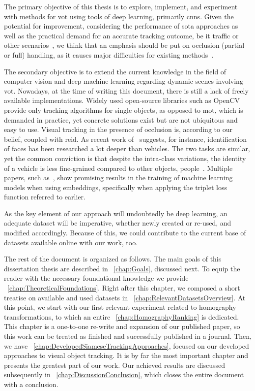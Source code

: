 The primary objective of this thesis is to explore, implement, and experiment with methods for \gls{vot} using tools of deep learning, primarily \glspl{cnn}. Given the potential for improvement, considering the performance of \gls{sota} approaches as well as the practical demand for an accurate tracking outcome, be it traffic or other scenarios~\cite{tang2019cityflow}, we think that an emphasis should be put on occlusion (partial or full) handling, as it causes major difficulties for existing methods~\cite{jiyan2007robustocclusion}.

The secondary objective is to extend the current knowledge in the field of computer vision and deep machine learning regarding dynamic scenes involving \gls{vot}. Nowadays, at the time of writing this document, there is still a lack of freely available implementations. Widely used open-source libraries such as OpenCV~\cite{bradski2000opencv} provide only tracking algorithms for single objects, as opposed to \gls{mot}, which is demanded in practice, yet concrete solutions exist but are not ubiquitous and easy to use. Visual tracking in the presence of occlusion is, according to our belief, coupled with \gls{reid}. As recent work of~\cite{kuma2019vehiclereid} suggests, for instance, identification of faces has been researched a lot deeper than vehicles. The two tasks are similar, yet the common conviction is that despite the intra-class variations, the identity of a vehicle is less fine-grained compared to other objects, \egtext{} people~\cite{kuma2019vehiclereid}. Multiple papers, such as~\cite{schroff2015facenet, hermans2017triplet}, show promising results in the training of machine learning models when using embeddings, specifically when applying the triplet loss function referred to earlier.

As the key element of our approach will undoubtedly be deep learning, an adequate dataset will be imperative, whether newly created or re-used, and modified accordingly. Because of this, we could contribute to the current base of datasets available online with our work, too.

The rest of the document is organized as follows. The main goals of this dissertation thesis are described in \chaptertext{}~\ref{chap:Goals}, discussed next. To equip the reader with the necessary foundational knowledge we provide \chaptertext{}~\ref{chap:TheoreticalFoundations}. Right after this chapter, we composed a short treatise on available and used datasets in \chaptertext{}~\ref{chap:RelevantDatasetsOverview}. At this point, we start with our first relevant experiment related to homography transformations, to which an entire \chaptertext{}~\ref{chap:HomographyRanking} is dedicated. This chapter is a one-to-one re-write and expansion of our published paper, so this work can be treated as finished and successfully published in a journal. Then, we have \chaptertext{}~\ref{chap:DevelopedSiameseTrackingApproaches}, focused on our developed approaches to visual object tracking. It is by far the most important chapter and presents the greatest part of our work. Our achieved results are discussed subsequently in \chaptertext{}~\ref{chap:DiscussionConclusion}, which closes the entire document with a conclusion.